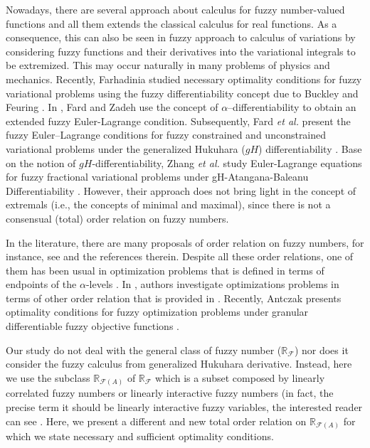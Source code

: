 \documentclass[12pt,a4paper]{article}
\newcommand{\RF}{\mathbb{R}_\mathcal{F}}
\newcommand{\RFA}{\mathbb{R}_{\mathcal{F}(A)}}
\begin{document}
Nowadays, there are several approach about calculus for fuzzy number-valued functions and all them extends the classical calculus for real functions. As a consequence, this can also be seen in  fuzzy approach to calculus of variations by considering fuzzy functions and their derivatives into the variational integrals to be extremized. This may occur naturally in many problems of physics and mechanics.  Recently, Farhadinia \cite{farhadinia2011necessary} studied necessary optimality conditions for fuzzy variational problems using the fuzzy differentiability concept due to Buckley and Feuring \cite{buckley2000fuzzy}. In \cite{fard2012note}, Fard and Zadeh use the concept of $\alpha$–differentiability to obtain an extended fuzzy Euler-Lagrange condition. Subsequently, Fard {\it et al.} present the fuzzy Euler–Lagrange conditions for fuzzy constrained and unconstrained variational problems under the generalized Hukuhara ($gH$) differentiability \cite{fard2014fuzzy}. 
Base on the notion of $gH$-differentiability, Zhang {\it et al.} study Euler-Lagrange equations for fuzzy fractional variational problems under gH-Atangana-Baleanu Differentiability \cite{zhang2018generalized}. 
However, their approach does not bring light in the concept of extremals (i.e., the concepts of minimal and maximal), since there is not a consensual (total) order relation on fuzzy numbers. 

In the literature, there are many proposals of order relation on fuzzy numbers, for instance, see \cite{goetschel86,neres2024alpha,valvis2009new,zumelzu2022admissible,wang2014total} and the references therein. Despite all these order relations, one of them has been usual in optimization problems that is defined in terms of endpoints of the $\alpha$-levels \cite{hernandez2022review,osuna2019optimality,osuna2016necessary}. In \cite{van2020convergence}, authors investigate optimizations problems in terms of other order relation that is provided in \cite{goetschel86}. Recently, Antczak presents optimality conditions for fuzzy optimization problems under granular differentiable fuzzy objective functions \cite{antczak2024optimality}.  

Our study do not deal with the general class of fuzzy number ($\RF$) nor does it consider the fuzzy calculus from generalized Hukuhara derivative. Instead, here we use the subclass $\RFA$ of $\RF$ which is a subset composed by linearly correlated fuzzy numbers or linearly interactive fuzzy numbers (in fact, the precise term it should be linearly
interactive fuzzy variables, the interested reader can see \cite{de2023interactive,costa2023theory}.
Here, we present a different and new total order relation on $\RFA$ for which we state necessary and sufficient optimality conditions. %
\end{document}
